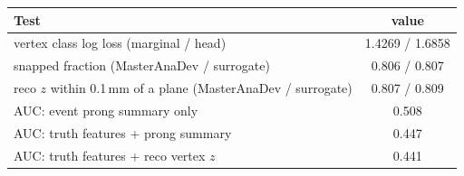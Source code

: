 \begin{tabular}{lc}
\toprule
Test & value \\
\midrule
vertex class log loss (marginal / head) & 1.4269 / 1.6858 \\
snapped fraction (MasterAnaDev / surrogate) & 0.806 / 0.807 \\
reco $z$ within 0.1\,mm of a plane (MasterAnaDev / surrogate) & 0.807 / 0.809 \\
\midrule
AUC: event prong summary only & 0.508 \\
AUC: truth features + prong summary & 0.447 \\
AUC: truth features + reco vertex $z$ & 0.441 \\
\bottomrule
\end{tabular}
